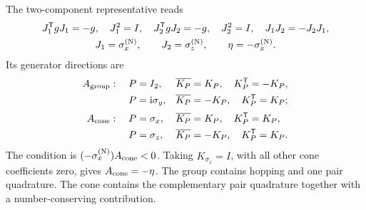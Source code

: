 The two-component representative reads
\begin{equation}
\begin{gathered}
J_1^{\mathsf{T}} gJ_1=-g,\quad J_1^2=I,\quad
J_2^{\mathsf{T}} gJ_2=-g,\quad J_2^2=I,\quad
J_1J_2=-J_2J_1,\\
J_1=\sigma_x^{({\rm N})},\qquad J_2=\sigma_z^{({\rm N})},\qquad \eta=-\sigma_x^{({\rm N})}.
\end{gathered}
\end{equation}
Its generator directions are
\begin{align*}
A_{\rm group}:\quad
P&=I_2,&&\overline{K_P}=K_P,\quad K_P^{\mathsf{T}}=-K_P,\\
P&=\mathrm{i}\sigma_y,&&\overline{K_P}=-K_P,\quad K_P^{\mathsf{T}}=K_P;\\[2pt]
A_{\rm cone}:\quad
P&=\sigma_x,&&\overline{K_P}=K_P,\quad K_P^{\mathsf{T}}=K_P,\\
P&=\sigma_z,&&\overline{K_P}=-K_P,\quad K_P^{\mathsf{T}}=K_P.
\end{align*}
The condition is \((-\sigma_x^{({\rm N})})A_{\rm cone}<0\).  Taking
\(K_{\sigma_x}=I\), with all other cone coefficients zero, gives \(A_{\rm cone}=-\eta\).  The group contains hopping and one pair quadrature.  The cone contains the complementary pair quadrature together with a number-conserving contribution.

